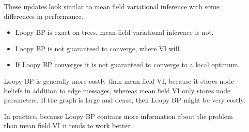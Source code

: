 \documentclass{article}
\begin{document}
These updates look similar to mean field variational inference with some differences in performance.
\begin{itemize}
	\item Loopy BP is exact on trees, mean-field variational inference is not.
	\item Loopy BP is not guaranteed to converge, where VI will.
	\item If Loopy BP converges it is not guaranteed to converge to a local optimum.
\end{itemize}
Loopy BP is generally more costly than mean field VI, because it stores node beliefs in addition to edge messages, whereas mean field VI only stores node parameters. If the graph is large and dense, then Loopy BP might be very costly. 

In practice, because Loopy BP contains more information about the problem than mean field VI it tends to work better.
\end{document}
